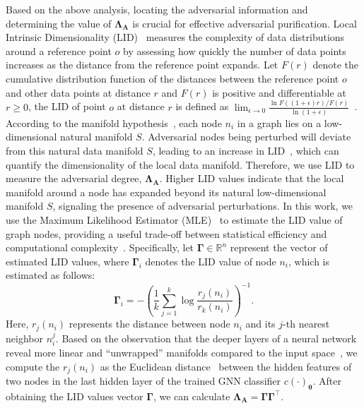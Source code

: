 Based on the above analysis, locating the adversarial information and determining the value of $\mathbf{\Lambda}_{\mathbf{A}}$ is crucial for effective adversarial purification. 
Local Intrinsic Dimensionality (LID)~\cite{houle2017local, ma2018characterizing} measures the complexity of data distributions around a reference point $o$ by assessing how quickly the number of data points increases as the distance from the reference point expands. Let $F(r)$ denote the cumulative distribution function of the distances between the reference point $o$ and other data points at distance $r$ and $F(r)$ is positive and differentiable at $r \geq 0$, the LID of point $o$ at distance $r$ is defined as $\mathop{\lim}_{\epsilon \rightarrow 0} \frac{\ln  F((1 + \epsilon)r) / F(r) }{\ln (1 + \epsilon)}$~\cite{houle2017local}. 
According to the manifold hypothesis~\cite{feinman2017detecting}, each node $n_{i}$ in a graph lies on a low-dimensional natural manifold $S$. 
Adversarial nodes being perturbed will deviate from this natural data manifold $S$, leading to an increase in LID~\cite{ma2018characterizing}, which can quantify the dimensionality of the local data manifold. Therefore, we use LID to measure the adversarial degree, $\mathbf{\Lambda}_{\mathbf{A}}$. Higher LID values indicate that the local manifold around a node has expanded beyond its natural low-dimensional manifold $S$, signaling the presence of adversarial perturbations.
In this work, we use the Maximum Likelihood Estimator (MLE)~\cite{amsaleg2015estimating} to estimate the LID value of graph nodes, providing a useful trade-off between statistical efficiency and computational complexity~\cite{ma2018characterizing}. 
Specifically, let $\mathbf{\Gamma} \in \mathbb{R}^{n}$ represent the vector of estimated LID values, where $\mathbf{\Gamma}_{i}$ denotes the LID value of node $n_{i}$, which is estimated as follows:
\begin{equation}
\label{equation_lid_score}
\mathbf{\Gamma}_{i} = -\left(\frac{1}{k}\sum_{j=1}^{k}\log \frac{r_{j}(n_{i})}{r_{k}(n_{i})}\right)^{-1}.
\end{equation}
Here, $r_{j}(n_{i})$ represents the distance between node $n_{i}$ and its $j$-th nearest neighbor $n_{i}^{j}$. 
Based on the observation that the deeper layers of a neural network reveal more linear and ``unwrapped'' manifolds compared to the input space~\cite{gal2016dropout}, we compute the $r_{j}(n_{i})$ as the Euclidean distance~\cite{dokmanic2015euclidean} between the hidden features of two nodes in the last hidden layer of the trained GNN classifier $c(\cdot)_{\boldsymbol{\theta}}$.
After obtaining the LID values vector $\mathbf{\Gamma}$, we can calculate $\mathbf{\Lambda}_{\mathbf{A}} = \mathbf{\Gamma} \mathbf{\Gamma}^{\top}$. 

